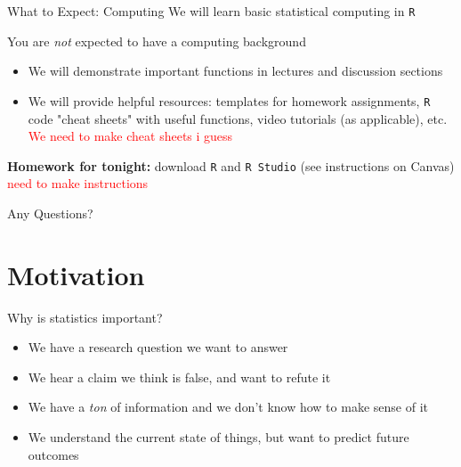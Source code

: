 \documentclass[10pt,t]{beamer}
\begin{document}
\begin{frame}{What to Expect: Computing}
We will learn basic statistical computing in \texttt{R}

\vspace{0.3cm}

You are \textit{not} expected to have a computing background

\vspace{0.3cm}

\begin{itemize}
	\item We will demonstrate important functions in lectures and discussion sections
	\item We will provide helpful resources: templates for homework assignments, \texttt{R} code "cheat sheets" with useful functions, video tutorials (as applicable), etc. \textcolor{red}{We need to make cheat sheets i guess}
\end{itemize}

\vspace{0.3cm}

\textbf{Homework for tonight:} download \texttt{R} and \texttt{R Studio} (see instructions on Canvas) \textcolor{red}{need to make instructions}

\end{frame}

\begin{frame}[c]
\centering \huge Any Questions?
\end{frame}

\section{Motivation}

\begin{frame}{Why is statistics important?}
\begin{itemize}
	\item We have a research question we want to answer
	\item We hear a claim we think is false, and want to refute it
	\item We have a \textit{ton} of information and we don't know how to make sense of it
	\item We understand the current state of things, but want to predict future outcomes
\end{itemize}
\end{frame}
\end{document}

